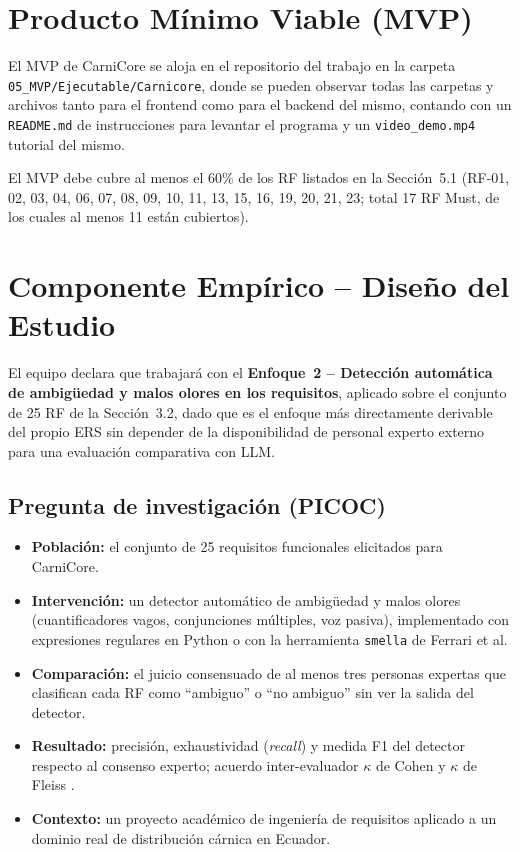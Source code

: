 \documentclass[11pt,a4paper]{article}
\begin{document}
\section{Producto Mínimo Viable (MVP)}
El MVP de CarniCore se aloja en el repositorio del trabajo en la carpeta 
\texttt{05\_MVP/Ejecutable/Carnicore}, donde se pueden observar todas las 
carpetas y archivos tanto para el frontend como para el backend del mismo, 
contando con un \texttt{README.md} de instrucciones para levantar el programa 
y un \texttt{video\_demo.mp4} tutorial del mismo. 

\noindent El MVP debe cubre al menos el 60\% de los RF listados en 
la Sección~5.1 (RF-01, 02, 03, 04, 06, 07, 08, 09, 10, 11, 13, 15, 16, 19, 20, 
21, 23; total 17 RF Must, de los cuales al menos 11 están cubiertos).

\section{Componente Empírico -- Diseño del Estudio}
El equipo declara que trabajará con el \textbf{Enfoque~2 -- Detección automática de ambigüedad y malos olores en los requisitos}, aplicado sobre el conjunto de 25 RF de la Sección~3.2, dado que es el enfoque más directamente derivable del propio ERS sin depender de la disponibilidad de personal experto externo para una evaluación comparativa con LLM.

\subsection{Pregunta de investigación (PICOC)}
\begin{itemize}[nosep]
\item \textbf{Población:} el conjunto de 25 requisitos funcionales elicitados para CarniCore.
\item \textbf{Intervención:} un detector automático de ambigüedad y malos olores (cuantificadores vagos, conjunciones múltiples, voz pasiva), implementado con expresiones regulares en Python o con la herramienta \texttt{smella} de Ferrari et al.
\item \textbf{Comparación:} el juicio consensuado de al menos tres personas expertas que clasifican cada RF como ``ambiguo'' o ``no ambiguo'' sin ver la salida del detector.
\item \textbf{Resultado:} precisión, exhaustividad (\textit{recall}) y medida F1 del detector respecto al consenso experto; acuerdo inter-evaluador $\kappa$ de Cohen \cite{cohen1960kappa} y $\kappa$ de Fleiss \cite{fleiss1971kappa}.
\item \textbf{Contexto:} un proyecto académico de ingeniería de requisitos aplicado a un dominio real de distribución cárnica en Ecuador.
\end{itemize}
\end{document}
